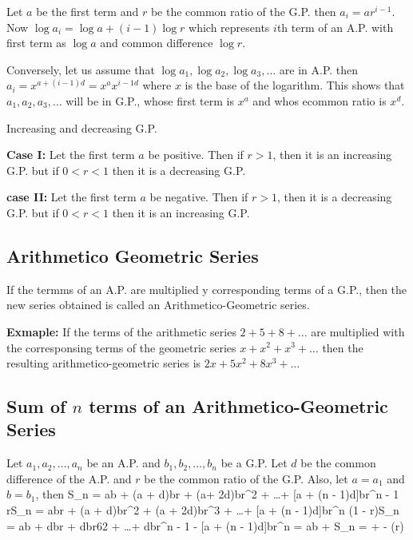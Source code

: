   Let $a$ be the first term and $r$ be the common ratio of the G.P. then $a_i = ar^{i - 1}$. Now $\log a_i = \log a + (i - 1)\log
  r$ which represents $i$th term of an A.P. with first term as $\log a$ and common difference $\log r$.

  Conversely, let us assume that $\log a_1, \log a_2, \log a_3, \ldots$ are in A.P. then $a_i = x^{a + (i - 1)d} = x^ax^{{i - 1}d}$
  where $x$ is the base of the logarithm. This shows that $a_1, a_2, a_3,\ldots$ will be in G.P., whose first term is $x^a$ and
  whos ecommon ratio is $x^d$.
\item Increasing and decreasing G.P.

  {\bf Case I:} Let the first term $a$ be positive. Then if $r > 1$, then it is an increasing G.P. but if $0< r< 1$ then it is a
  decreasing G.P.

  {\bf case II:} Let the first term $a$ be negative. Then if $r > 1$, then it is a decreasing G.P. but if $0 < r < 1$ then it is
  an increasing G.P.
\stopitemize

\subsection{Arithmetico Geometric Series}
If the termms of an A.P. are multiplied y corresponding terms of a G.P., then the new series obtained is called an
Arithmetico-Geometric series.

{\bf Exmaple:} If the terms of the arithmetic series $2 + 5 + 8 + \ldots$ are multiplied with the corresponsing terms of the
geometric series $x + x^2 + x^3 + \ldots$ then the resulting arithmetico-geometric series is $2x + 5x^2 + 8x^3 + \ldots$

\subsection{Sum of $n$ terms of an Arithmetico-Geometric Series}
Let $a_1, a_2, \ldots, a_n$ be an A.P. and $b_1, b_2, \ldots, b_n$ be a G.P. Let $d$ be the common difference of the A.P. and $r$
be the common ratio of the G.P. Also, let $a = a_1$ and $b = b_1$, then
\startformula S_n = ab + (a + d)br + (a+ 2d)br^2 + \ldots + [a + (n - 1)d]br^{n - 1}\stopformula
\startformula rS_n = abr + (a + d)br^2 + (a + 2d)br^3 + \ldots + [a + (n - 1)d]br^n\stopformula
\startformula \Rightarrow (1 - r)S_n = ab + dbr + dbr62 + \ldots + dbr^{n - 1} - [a + (n - 1)d]br^n\stopformula
\startformula = ab + \stopformula
\startformula S_n =  +  - (r)\stopformula

